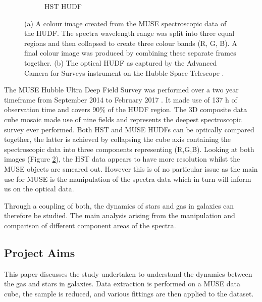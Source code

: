 \documentclass[12pt, twocolumn]{revtex4}    %
\begin{document}
\begin{figure}
\begin{subfigure}[b]{0.4\textwidth}
    \captionsetup{justification=justified}    
    \caption{HST HUDF}
    \label{fig:hubble_ultra_deep_field}
  \end{subfigure}
  \captionsetup{justification=justified}
  \caption[Hubble Ultra Deep Field]{(a) A colour image created from the MUSE spectroscopic data of the HUDF. The spectra wavelength range was split into three equal regions and then collapsed to create three colour bands (R, G, B). A final colour image was produced by combining these separate frames together. (b) The optical HUDF as captured by the Advanced Camera for Surveys instrument on the Hubble Space Telescope \citep{hudf_image}. }
  \label{fig:hst_muse_hdf}
\end{figure}

The MUSE Hubble Ultra Deep Field Survey was performed over a two year timeframe from September 2014 to February 2017 \citep{bacon_muse_hudf}. It made use of 137 h of observation time and covers 90\% of the HUDF region. The 3D composite data cube mosaic made use of nine fields and represents the deepest spectroscopic survey ever performed. Both HST and MUSE HUDFs can be optically compared together, the latter is achieved by collapsing the cube axis containing the spectroscopic data into three components representing (R,G,B). Looking at both images (Figure \ref{fig:hst_muse_hdf}), the HST data appears to have more resolution whilst the MUSE objects are smeared out. However this is of no particular issue as the main use for MUSE is the manipulation of the spectra data which in turn will inform us on the optical data.




Through a coupling of both, the dynamics of stars and gas in galaxies can therefore be studied. The main analysis arising from the manipulation and comparison of different component areas of the spectra.

\subsection{Project Aims}
This paper discusses the study undertaken to understand the dynamics between the gas and stars in galaxies. Data extraction is performed on a MUSE data cube, the sample is reduced, and various fittings are then applied to the dataset.
\end{document}

